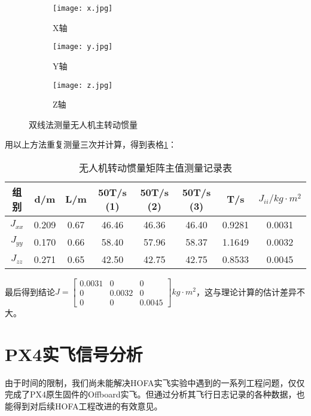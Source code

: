   \begin{figure}[H]
    \centering
    \begin{subfigure}[c]{0.33\textwidth}
      \centering
      \texttt{[image: x.jpg]}  %
      \caption{X轴}
    \end{subfigure}\hfill
    \begin{subfigure}[c]{0.33\textwidth}
      \centering
      \texttt{[image: y.jpg]}  %
      \caption{Y轴}
    \end{subfigure}\hfill
    \begin{subfigure}[c]{0.33\textwidth}
      \centering
      \texttt{[image: z.jpg]}  %
      \caption{Z轴}
    \end{subfigure}
    \caption{双线法测量无人机主转动惯量}
    \label{双线法}
\end{figure}


用以上方法重复测量三次并计算，得到表格\ref{三次}：
  
  \begin{table}[H]
    \centering
    \caption{无人机转动惯量矩阵主值测量记录表}
    \label{三次}
    \begin{tabular}{cccccccc}
        \toprule
        组别&d/m  & L/m & 50T/s (1) & 50T/s (2) &50T/s (3) & T/s & $J_{ii} / kg \cdot m^2$\\
        \midrule
        $J_{xx}$ & 0.209 &0.67 & 46.46 & 46.36 & 46.40 &0.9281 &0.0031\\
        $J_{yy}$ & 0.170 &0.66 & 58.40 & 57.96 & 58.37 &1.1649 &0.0032\\
        $J_{zz}$ & 0.271 & 0.65& 42.50 & 42.75 & 42.75 &0.8533 &0.0045\\
        \bottomrule
    \end{tabular}
\end{table}

最后得到结论$J=\begin{bmatrix}
  0.0031 &0&0\\
  0&0.0032&0\\
  0&0& 0.0045
\end{bmatrix}kg \cdot m^2$，这与理论计算的估计差异不大。
\newpage
\section{PX4实飞信号分析}
由于时间的限制，我们尚未能解决HOFA实飞实验中遇到的一系列工程问题，仅仅完成了PX4原生固件的Offboard实飞。但通过分析其飞行日志记录的各种数据，也能得到对后续HOFA工程改进的有效意见。

